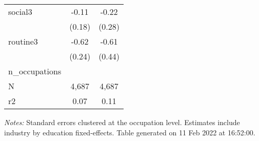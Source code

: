 \begin{center}
\begin{threeparttable}[!h]
\begin{tabular}{lcc}
social3             &       -0.11         &       -0.22         \\
                    &      (0.18)         &      (0.28)         \\
routine3            &       -0.62\sym{*}  &       -0.61         \\
                    &      (0.24)         &      (0.44)         \\
n\_occupations       &                     &                     \\
N                   &       4,687         &       4,687         \\
r2                  &        0.07         &        0.11         \\
\bottomrule
\bottomrule
\end{tabular}
\begin{tablenotes}
\item \footnotesize \textit{Notes:} Standard errors clustered at the occupation level. Estimates include industry by education fixed-effects. Table generated on 11 Feb 2022 at 16:52:00.
\end{tablenotes}
\end{threeparttable}
\end{center}
